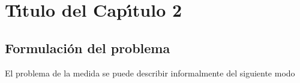 \chapter{T\'{\i}tulo del Cap\'{\i}tulo 2}
\graphicspath{{figs/}}


\label{titulo-cap-2}


\section{Formulaci\'{o}n del problema}
\label{S:form-del-probl}

El problema de la medida se puede describir informalmente del siguiente modo \cite{Bohr1913PMp10}


